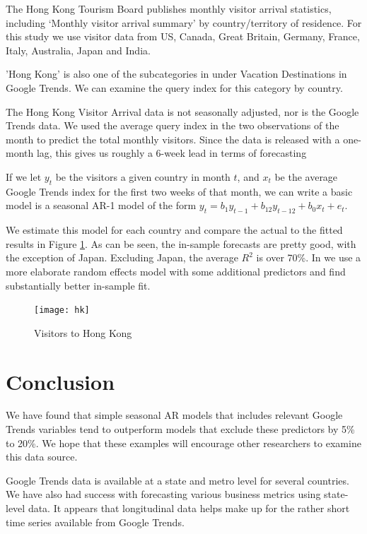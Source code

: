 \documentclass[12pt, oneside]{article}
\begin{document}
The Hong Kong Tourism Board publishes monthly visitor arrival
statistics, including `Monthly visitor arrival summary' by
country/territory of residence. For this study we use visitor data
from US, Canada, Great Britain, Germany, France, Italy, Australia,
Japan and India.

'Hong Kong' is also one of the subcategories in under Vacation
Destinations in Google Trends.  We can examine the query index for
this category by country.

The Hong Kong Visitor Arrival data is not seasonally adjusted, nor is
the Google Trends data.  We used the average query index in the two
observations of the month to predict the total monthly visitors.
Since the data is released with a one-month lag, this gives us roughly
a 6-week lead in terms of forecasting

If we let $y_t$ be the visitors a given country in month $t$, and
$x_t$ be the average Google Trends index for the first two weeks of
that month, we can write a basic model is a seasonal AR-1 model of the
form $y_t = b_1y_{t-1} + b_{12}y_{t-12} + b_0x_{t} + e_t$.

We estimate this model for each country and compare the actual to the
fitted results in Figure \ref{Fig:hk}.  As can be seen, the in-sample
forecasts are pretty good, with the exception of Japan.  Excluding
Japan, the average $R^2$ is over 70\%.  In \cite{Choi09a} we use a
more elaborate random effects model with some additional predictors
and find substantially better in-sample fit.

\begin{figure}[ht]
\begin{center}
\texttt{[image: hk]}
\caption{\label{Fig:hk} Visitors to Hong Kong} 
\end{center}
\end{figure}


\section{Conclusion \label{Sec:Conclusion}}  

We have found that simple seasonal AR models that includes relevant
Google Trends variables tend to outperform models that exclude these
predictors by 5\% to 20\%.  We hope that these examples will encourage
other researchers to examine this data source.

Google Trends data is available at a state and metro level for several
countries.  We have also had success with forecasting various business
metrics using state-level data.  It appears that longitudinal data helps
make up for the rather short time series available from Google Trends.



\end{document}
